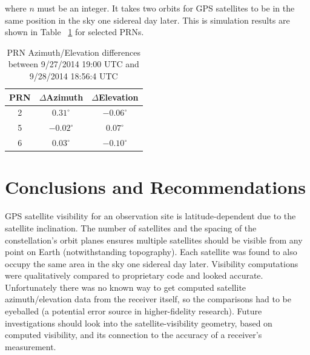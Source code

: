 \documentclass[paper]{aiaaNew}
\begin{document}
where $n$ must be an integer.  It takes two orbits for GPS satellites to be in the same position in the sky one sidereal day later.  This is simulation results are shown in Table ~\ref{PRNAzElDiff} for selected PRNs.

\begin{table}[H]
\centering

\begin{tabular}{|c|c|c|}  
\hline
PRN & $\Delta$Azimuth & $\Delta$Elevation\\
\hline\hline
2 & $0.31^{\circ}$ & $-0.06^{\circ}$\\  
\hline
5 & $-0.02^{\circ}$ & $0.07^{\circ}$\\
\hline
6 & $0.03^{\circ}$ & $-0.10^{\circ}$\\
\hline
\end{tabular}

\caption[font=small,labelfont=bf]{PRN Azimuth/Elevation differences between 9/27/2014 19:00 UTC and 9/28/2014 18:56:4 UTC}
\label{PRNAzElDiff}
\end{table}

\section{Conclusions and Recommendations}
GPS satellite visibility for an observation site is latitude-dependent due to the satellite inclination.  The number of satellites and the spacing of the constellation's orbit planes ensures multiple satellites should be visible from any point on Earth (notwithstanding topography).  Each satellite was found to also occupy the same area in the sky one sidereal day later.  Visibility computations were qualitatively compared to proprietary code and looked accurate.  Unfortunately there was no known way to get computed satellite azimuth/elevation data from the receiver itself, so the comparisons had to be eyeballed (a potential error source in higher-fidelity research). Future investigations should look into the satellite-visibility geometry, based on computed visibility, and its connection to the accuracy of a receiver's measurement. 

\end{document}
